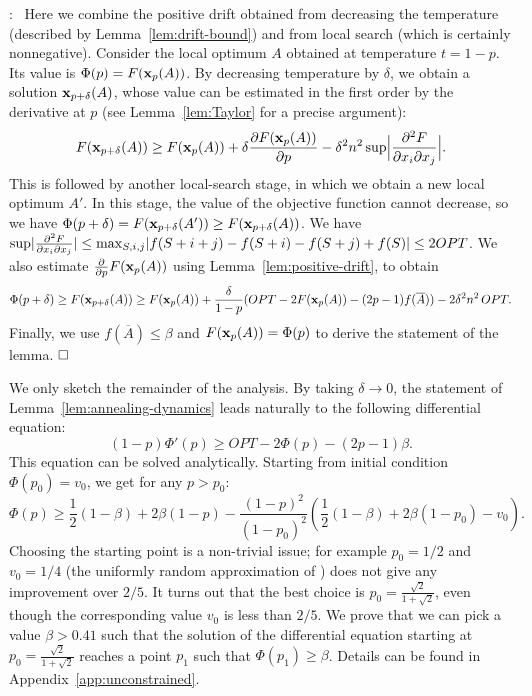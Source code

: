 \documentclass{article}[11pt]
\newcommand{\partdiff}[2]{\frac{\partial {#1}}{\partial {#2}}}
\newcommand{\mixdiff}[3]{\frac{\partial^2 {#1}}{{\partial {#2}}{\partial {#3}}}}
\renewenvironment{proof}{\noindent{\bf Proof}:~}{$\hfill \Box$\\}
\def\bx{{\bf x}}
\def\max{{\rm{max}}}
\def\sup{{\rm{sup}}}
\begin{document}
\begin{proof}
Here we combine the positive drift obtained from decreasing the temperature
(described by Lemma~\ref{lem:drift-bound})
and from local search (which is certainly nonnegative).
Consider the local optimum $A$ obtained at temperature $t = 1-p$.
Its value is $\Phi(p) = F(\bx_p(A))$.
By decreasing temperature by $\delta$, we obtain a solution $\bx_{p+\delta}(A)$,
whose value can be estimated in the first order by the derivative at $p$
(see Lemma~\ref{lem:Taylor} for a precise argument):
$$ F(\bx_{p+\delta}(A)) \geq F(\bx_p(A)) + \delta \partdiff{F(\bx_p(A))}{p}  
 - \delta^2 n^2 \, \sup \Big|\mixdiff{F}{x_i}{x_j}\Big|. $$
This is followed by another local-search stage, in which we obtain a new local optimum $A'$.
In this stage, the value of the objective function cannot decrease, so we have
$ \Phi(p+\delta) = F(\bx_{p+\delta}(A')) \geq F(\bx_{p+\delta}(A))$.
We have $\sup |\mixdiff{F}{x_i}{x_j}| \leq \max_{S,i,j} |f(S+i+j)-f(S+i)-f(S+j)+f(S)| \leq 2 OPT$.
We also estimate $\partdiff{}{p} F(\bx_p(A))$ using Lemma~\ref{lem:positive-drift}, to obtain
$$ \Phi(p+\delta) \geq F(\bx_{p+\delta}(A)) \geq
 F(\bx_p(A)) + \frac{\delta}{1-p} (OPT - 2 F(\bx_p(A)) - (2p-1) f(\overline{A}))
 - 2 \delta^2 n^2 \, OPT. $$
Finally, we use $f(\overline{A})\leq \beta$ and $F(\bx_p(A)) = \Phi(p)$
to derive the statement of the lemma.
\end{proof}

We only sketch the remainder of the analysis. By taking $\delta \rightarrow 0$,
the statement of
Lemma~\ref{lem:annealing-dynamics} leads naturally to the following differential equation:
$$ (1-p) \Phi'(p) \geq OPT - 2 \Phi(p) - (2p-1) \beta.$$
This equation can be solved analytically. Starting from initial condition $\Phi(p_0) = v_0$,
we get for any $p>p_0$:
$$ \Phi(p) \geq \frac12 (1-\beta) + 2 \beta (1-p) -
 \frac{(1-p)^2}{(1-p_0)^2} \left(\frac12 (1-\beta) + 2 \beta (1-p_0) - v_0 \right).$$ 
Choosing the starting point is a non-trivial issue; for example $p_0 = 1/2$ and $v_0 = 1/4$
(the uniformly random approximation of \cite{FMV07}) does not give any improvement over $2/5$.
It turns out that the best choice is $p_0 = \frac{\sqrt{2}}{1+\sqrt{2}}$,
even though the corresponding value $v_0$ is less than $2/5$.  We prove that we can pick
a value $\beta > 0.41$ such that the solution of the differential equation starting at 
$p_0 = \frac{\sqrt{2}}{1+\sqrt{2}}$ reaches a point $p_1$ such that $\Phi(p_1) \geq \beta$.
Details can be found in Appendix~\ref{app:unconstrained}.
\end{document}
